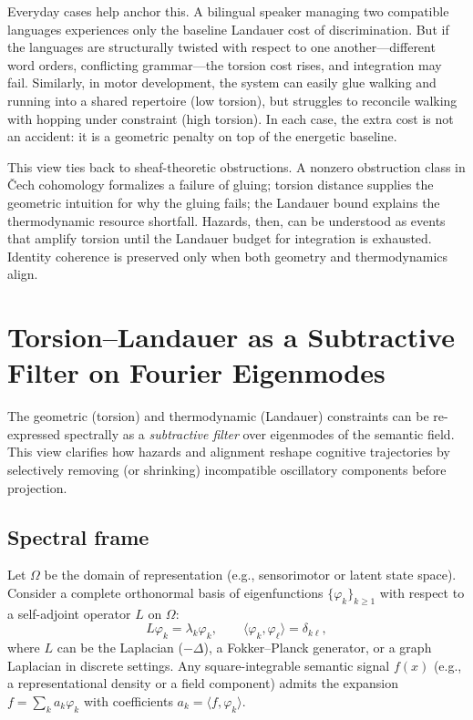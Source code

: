 \documentclass[a4paper,11pt]{article}
\begin{document}
Everyday cases help anchor this. A bilingual speaker managing two compatible
languages experiences only the baseline Landauer cost of discrimination. But if
the languages are structurally twisted with respect to one another—different
word orders, conflicting grammar—the torsion cost rises, and integration may
fail. Similarly, in motor development, the system can easily glue walking and
running into a shared repertoire (low torsion), but struggles to reconcile
walking with hopping under constraint (high torsion). In each case, the extra
cost is not an accident: it is a geometric penalty on top of the energetic
baseline.

This view ties back to sheaf-theoretic obstructions. A nonzero obstruction
class in Čech cohomology formalizes a failure of gluing; torsion distance
supplies the geometric intuition for why the gluing fails; the Landauer bound
explains the thermodynamic resource shortfall. Hazards, then, can be
understood as events that amplify torsion until the Landauer budget for
integration is exhausted. Identity coherence is preserved only when both
geometry and thermodynamics align.

\section{Torsion--Landauer as a Subtractive Filter on Fourier Eigenmodes}
\label{sec:spectral-filter}

The geometric (torsion) and thermodynamic (Landauer) constraints can be
re-expressed spectrally as a \emph{subtractive filter} over eigenmodes of the
semantic field. This view clarifies how hazards and alignment reshape cognitive
trajectories by selectively removing (or shrinking) incompatible oscillatory
components before projection.

\subsection{Spectral frame}
Let $\Omega$ be the domain of representation (e.g., sensorimotor or latent
state space). Consider a complete orthonormal basis of eigenfunctions
$\{\varphi_k\}_{k\ge1}$ with respect to a self-adjoint operator $L$ on $\Omega$:
\[
L\varphi_k=\lambda_k \varphi_k,\qquad
\langle \varphi_k,\varphi_\ell\rangle=\delta_{k\ell},
\]
where $L$ can be the Laplacian ($-\Delta$), a Fokker--Planck generator, or a
graph Laplacian in discrete settings. Any square-integrable semantic signal
$f(x)$ (e.g., a representational density or a field component) admits the
expansion $f=\sum_k a_k \varphi_k$ with coefficients $a_k=\langle f,\varphi_k\rangle$.
\end{document}
